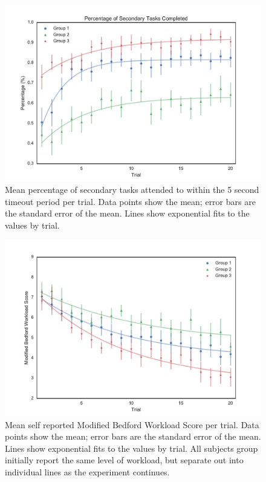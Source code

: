 \documentclass[]{aiaa-tc}%
\begin{document}
\begin{figure}[tb!]
  \centering
  \includegraphics[width=0.8\linewidth]{figs/Group_Percentage_fit_30.pdf}
  \caption[Mean percentage of secondary tasks attended to within the 5 second timeout period per trial]{Mean percentage of secondary tasks attended to within the 5 second timeout period per trial. Data points show the mean; error bars are the standard error of the mean. Lines show exponential fits to the values by trial.}
  \label{fig:secondary}
  \vspace{1em}
\end{figure}

\begin{figure}[tb!]
  \centering
  \includegraphics[width=0.8\linewidth]{figs/Group_workload_fit_30.pdf}
  \caption[Mean self reported Modified Bedford Workload Score per trial]{Mean self reported Modified Bedford Workload Score per trial. Data points show the mean; error bars are the standard error of the mean. Lines show exponential fits to the values by trial. All subjects group initially report the same level of workload, but separate out into individual lines as the experiment continues.
  }
  \label{fig:workload}
\end{figure}
\end{document}
